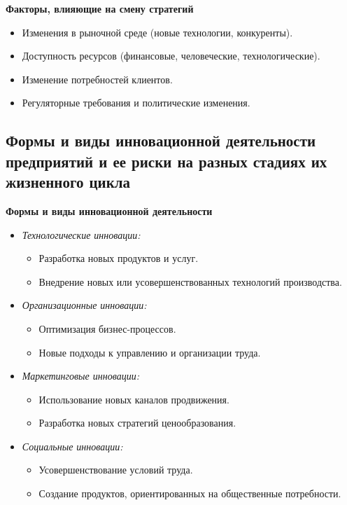 \textbf{Факторы, влияющие на смену стратегий}
\begin{itemize}
    \item Изменения в рыночной среде (новые технологии, конкуренты).
    \item Доступность ресурсов (финансовые, человеческие, технологические).
    \item Изменение потребностей клиентов.
    \item Регуляторные требования и политические изменения.
\end{itemize}

\pagebreak
\subsection{Формы и виды инновационной деятельности предприятий и ее риски на разных стадиях их жизненного цикла}

\textbf{Формы и виды инновационной деятельности}
\begin{itemize}
    \item \textit{Технологические инновации:}
    \begin{itemize}
        \item Разработка новых продуктов и услуг.
        \item Внедрение новых или усовершенствованных технологий производства.
    \end{itemize}
    \item \textit{Организационные инновации:}
    \begin{itemize}
        \item Оптимизация бизнес-процессов.
        \item Новые подходы к управлению и организации труда.
    \end{itemize}
    \item \textit{Маркетинговые инновации:}
    \begin{itemize}
        \item Использование новых каналов продвижения.
        \item Разработка новых стратегий ценообразования.
    \end{itemize}
    \item \textit{Социальные инновации:}
    \begin{itemize}
        \item Усовершенствование условий труда.
        \item Создание продуктов, ориентированных на общественные потребности.
    \end{itemize}
\end{itemize}

